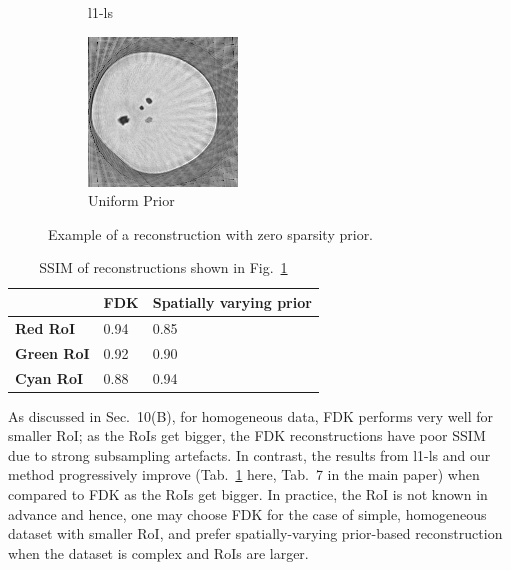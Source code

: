 \documentclass{article}
\begin{document}
\begin{figure}[!h]
\begin{subfigure}[b]{0.3\linewidth}
        \caption{l1-ls}
     \end{subfigure}
    \begin{subfigure}[b]{0.3\linewidth}
        \includegraphics[width=\textwidth]{../images/potato/cs_lambda_0/weightedPriorIm_green.png}
        \caption{Uniform Prior}
     \end{subfigure}
     \caption{Example of a reconstruction with zero sparsity prior.}
     \label{fig:potato_cs_lambda_0}
\end{figure}
\begin{table}[!h]
  \centering
  \caption{SSIM of reconstructions shown in Fig.~\ref{fig:potato_cs_lambda_0}}
\begin{tabular}{|l|l|l|}
\hline
 & \textbf{FDK} & \textbf{Spatially varying prior} \\ \hline
\textbf{Red RoI} & 0.94 & 0.85 \\ \hline
\textbf{Green RoI} & 0.92 & 0.90 \\ \hline
\textbf{Cyan RoI} & 0.88 & 0.94 \\ \hline
\end{tabular}
\label{tab:zerocslambda}
\end{table}

As discussed in Sec.~10(B), for homogeneous data, FDK performs very
well for smaller RoI; as the RoIs get bigger, the FDK reconstructions
have poor SSIM due to strong subsampling artefacts. In contrast, the
results from l1-ls and our method progressively improve
(Tab.~\ref{tab:zerocslambda} here, Tab.~7 in the main paper) when compared to FDK as the RoIs get
bigger. In practice, the RoI is not known in advance and hence, one
may choose FDK for the case of simple, homogeneous dataset with
smaller RoI, and prefer spatially-varying prior-based reconstruction
when the dataset is complex and RoIs are larger.\\
\end{document}
